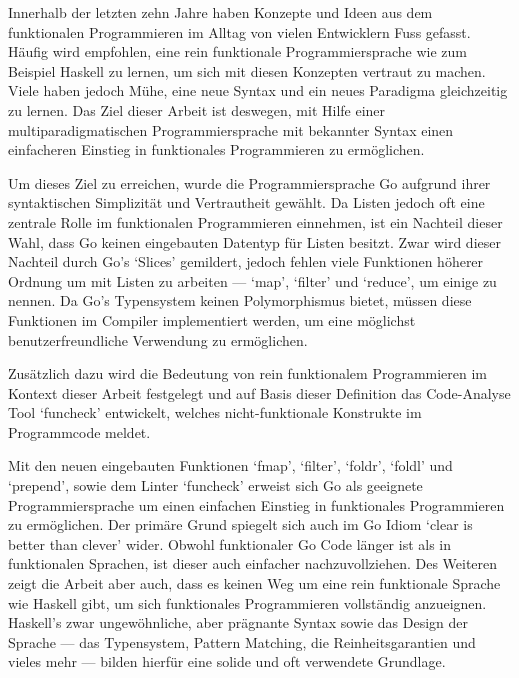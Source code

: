 
Innerhalb der letzten zehn Jahre haben Konzepte und Ideen aus dem funktionalen
Programmieren im Alltag von vielen Entwicklern Fuss gefasst. Häufig wird
empfohlen, eine rein funktionale Programmiersprache wie zum Beispiel Haskell
zu lernen, um sich mit diesen Konzepten vertraut zu machen. Viele haben jedoch
Mühe, eine neue Syntax und ein neues Paradigma gleichzeitig zu lernen. Das Ziel
dieser Arbeit ist deswegen, mit Hilfe einer multiparadigmatischen Programmiersprache mit
bekannter Syntax einen einfacheren Einstieg in funktionales Programmieren zu ermöglichen.

Um dieses Ziel zu erreichen, wurde die Programmiersprache Go aufgrund ihrer
syntaktischen Simplizität und Vertrautheit gewählt.
Da Listen jedoch oft eine zentrale Rolle im funktionalen Programmieren einnehmen, ist ein
Nachteil dieser Wahl, dass Go keinen eingebauten Datentyp für Listen besitzt. Zwar wird
dieser Nachteil durch Go's `Slices' gemildert, jedoch fehlen viele Funktionen höherer
Ordnung um mit Listen zu arbeiten --- `map', `filter' und `reduce', um einige zu nennen.
Da Go's Typensystem keinen Polymorphismus bietet, müssen diese Funktionen im Compiler
implementiert werden, um eine möglichst benutzerfreundliche Verwendung zu ermöglichen.

Zusätzlich dazu wird die Bedeutung von rein funktionalem Programmieren im Kontext dieser Arbeit
festgelegt und auf Basis dieser Definition das Code-Analyse Tool `funcheck' entwickelt, welches
nicht-funktionale Konstrukte im Programmcode meldet.

Mit den neuen eingebauten Funktionen `fmap', `filter', `foldr', `foldl' und `prepend',
sowie dem Linter `funcheck' erweist sich Go als geeignete Programmiersprache um
einen einfachen Einstieg in funktionales Programmieren zu ermöglichen. Der primäre Grund
spiegelt sich auch im Go Idiom `clear is better than clever' wider. Obwohl funktionaler
Go Code länger ist als in funktionalen Sprachen, ist dieser auch einfacher nachzuvollziehen.
Des Weiteren zeigt die Arbeit aber auch, dass es keinen Weg um eine rein funktionale Sprache
wie Haskell gibt, um sich funktionales Programmieren vollständig anzueignen.
Haskell's zwar ungewöhnliche, aber prägnante Syntax sowie das Design
der Sprache --- das Typensystem, Pattern Matching, die Reinheitsgarantien und vieles mehr ---
bilden hierfür eine solide und oft verwendete Grundlage.
